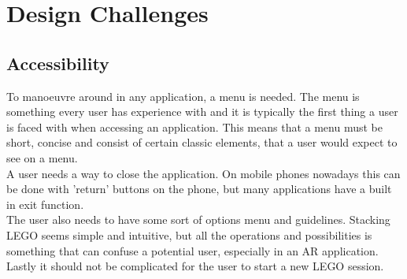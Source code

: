 
\section{Design Challenges}
\subsection{Accessibility}
To manoeuvre around in any application, a menu is needed. The menu is something every user has experience with and it is typically the first thing a user is faced with when accessing an application. This means that a menu must be short, concise and consist of certain classic elements, that a user would expect to see on a menu.\\ A user needs a way to close the application. On mobile phones nowadays this can be done with 'return' buttons on the phone, but many applications have a built in exit function.\\
The user also needs to have some sort of options menu and guidelines. Stacking LEGO seems simple and intuitive, but all the operations and possibilities is something that can confuse a potential user, especially in an AR application. \\
Lastly it should not be complicated for the user to start a new LEGO session.
